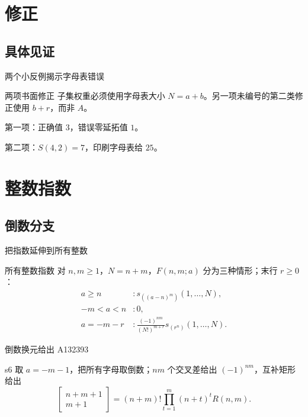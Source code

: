 \documentclass{beamer}
\begin{document}
\section{修正}
\subsection{具体见证}
\begin{frame}{两个小反例揭示字母表错误}
  \begin{block}{两项书面修正}
    子集权重必须使用字母表大小 $N=a+b$。另一项未编号的第二类修正使用 $b+r$，而非 $A$。\par\smallskip
    第一项：正确值 $3$，错误零延拓值 $1$。\par
    第二项：$S(4,2)=7$，印刷字母表给 $25$。
  \end{block}
\end{frame}
\section{整数指数}
\subsection{倒数分支}
\begin{frame}{把指数延伸到所有整数}
  \begin{block}{所有整数指数}
    对 $n,m\ge1$，$N=n+m$，$F(n,m;a)$ 分为三种情形；末行 $r\ge0$：
    \[
    \begin{aligned}
    a\ge n &: s_{((a-n)^m)}(1,\ldots,N),\\
    -m<a<n &: 0,\\
    a=-m-r &: \frac{(-1)^{nm}}{(N!)^{m+r}}s_{(r^n)}(1,\ldots,N).
    \end{aligned}
    \]
  \end{block}
\end{frame}
\begin{frame}{倒数换元给出 A132393}
  \begin{bookresult}{s6}
    取 $a=-m-1$，把所有字母取倒数；$nm$ 个交叉差给出 $(-1)^{nm}$，互补矩形给出
    \[
      \left[\begin{matrix}n+m+1\\m+1\end{matrix}\right]
      =(n+m)!\prod_{t=1}^{m}(n+t)^tR(n,m).
    \]
  \end{bookresult}
\end{frame}
\end{document}
